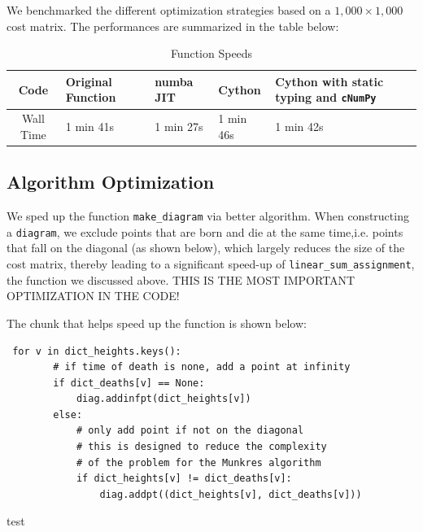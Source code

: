 \documentclass[codesnippet]{jss}
\begin{document}
We benchmarked the different optimization strategies based on a $1,000 \times 1,000$ cost matrix. The performances are  summarized in the table below:
\begin{table}[]
\centering
\caption{Function Speeds}
\label{my-label}
\begin{tabular}{@{}|c|l|l|l|l|@{}}
\toprule
Code      & Original Function & numba JIT & Cython    & Cython with static typing and \texttt{cNumPy} \\ \midrule
Wall Time & 1 min 41s         & 1 min 27s & 1 min 46s & 1 min 42s                                       \\ \bottomrule
\end{tabular}
\end{table}

\subsection{Algorithm Optimization}
We sped up the function \texttt{make\_diagram} via better algorithm. When constructing a \texttt{diagram}, we exclude points that are born and die at the same time,i.e. points that fall on the diagonal (as shown below), which largely reduces the size of the cost matrix, thereby leading to a significant speed-up of \texttt{linear\_sum\_assignment}, the function we discussed above.  THIS IS THE MOST IMPORTANT OPTIMIZATION IN THE CODE!

The chunk that helps speed up the function is shown below:
\begin{verbatim}
 for v in dict_heights.keys():
        # if time of death is none, add a point at infinity
        if dict_deaths[v] == None:
            diag.addinfpt(dict_heights[v])
        else:
            # only add point if not on the diagonal
            # this is designed to reduce the complexity
            # of the problem for the Munkres algorithm
            if dict_heights[v] != dict_deaths[v]:
                diag.addpt((dict_heights[v], dict_deaths[v]))
\end{verbatim}
test \citet{foo2010}
%

\end{document}

